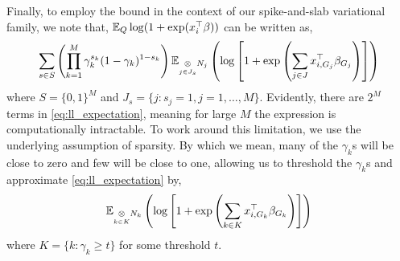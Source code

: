 \break

Finally, to employ the bound in the context of our spike-and-slab variational family, we note that, $\mathbb{E}_Q \log ( 1 + \exp (x_i^\top \beta))$ can be written as,
\begin{equation} \label{eq:ll_expectation}
    \sum_{s \in S} \left( 
	\prod_{k=1}^M \gamma_k^{s_k} (1- \gamma_k )^{1- s_k} 
    \right)
    \mathbb{E}_{\underset{j \in J_s}{\otimes} N_j}
    \left( 
	\log \left[ 1 + \exp \left( \sum_{j \in J} x^\top_{i, G_j} \beta_{G_j} \right) \right] 
    \right)
\end{equation}
where $ S = \{0, 1\}^{M}$ and $J_s = \{j : s_j = 1, j=1,\dots,M \}$. Evidently, there are $2^M$ terms in \eqref{eq:ll_expectation}, meaning for large $M$ the expression is computationally intractable. To work around this limitation, we use the underlying assumption of sparsity. By which we mean, many of the $\gamma_k$s will be close to zero and few will be close to one, allowing us to threshold the $\gamma_k$s and approximate \eqref{eq:ll_expectation} by,
\begin{equation}
    \mathbb{E}_{\underset{k \in K}{\otimes} N_k}
    \left( 
	\log \left[ 1 + \exp \left( \sum_{k \in K} x^\top_{i, G_k} \beta_{G_k} \right) \right] 
    \right)
\end{equation}
where $K = \{k : \gamma_k \geq t \}$ for some threshold $t$.







